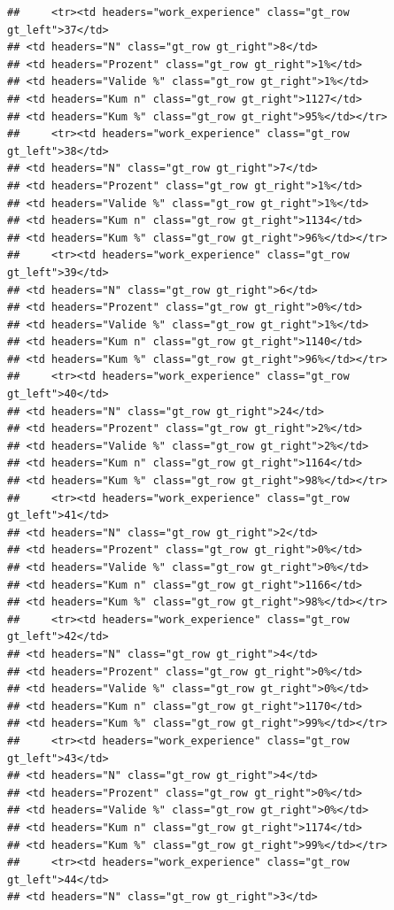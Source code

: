 \documentclass[
  a4paper,
  DIV=11,
  numbers=noendperiod]{scrartcl}
\begin{document}
\begin{verbatim}
##     <tr><td headers="work_experience" class="gt_row gt_left">37</td>
## <td headers="N" class="gt_row gt_right">8</td>
## <td headers="Prozent" class="gt_row gt_right">1%</td>
## <td headers="Valide %" class="gt_row gt_right">1%</td>
## <td headers="Kum n" class="gt_row gt_right">1127</td>
## <td headers="Kum %" class="gt_row gt_right">95%</td></tr>
##     <tr><td headers="work_experience" class="gt_row gt_left">38</td>
## <td headers="N" class="gt_row gt_right">7</td>
## <td headers="Prozent" class="gt_row gt_right">1%</td>
## <td headers="Valide %" class="gt_row gt_right">1%</td>
## <td headers="Kum n" class="gt_row gt_right">1134</td>
## <td headers="Kum %" class="gt_row gt_right">96%</td></tr>
##     <tr><td headers="work_experience" class="gt_row gt_left">39</td>
## <td headers="N" class="gt_row gt_right">6</td>
## <td headers="Prozent" class="gt_row gt_right">0%</td>
## <td headers="Valide %" class="gt_row gt_right">1%</td>
## <td headers="Kum n" class="gt_row gt_right">1140</td>
## <td headers="Kum %" class="gt_row gt_right">96%</td></tr>
##     <tr><td headers="work_experience" class="gt_row gt_left">40</td>
## <td headers="N" class="gt_row gt_right">24</td>
## <td headers="Prozent" class="gt_row gt_right">2%</td>
## <td headers="Valide %" class="gt_row gt_right">2%</td>
## <td headers="Kum n" class="gt_row gt_right">1164</td>
## <td headers="Kum %" class="gt_row gt_right">98%</td></tr>
##     <tr><td headers="work_experience" class="gt_row gt_left">41</td>
## <td headers="N" class="gt_row gt_right">2</td>
## <td headers="Prozent" class="gt_row gt_right">0%</td>
## <td headers="Valide %" class="gt_row gt_right">0%</td>
## <td headers="Kum n" class="gt_row gt_right">1166</td>
## <td headers="Kum %" class="gt_row gt_right">98%</td></tr>
##     <tr><td headers="work_experience" class="gt_row gt_left">42</td>
## <td headers="N" class="gt_row gt_right">4</td>
## <td headers="Prozent" class="gt_row gt_right">0%</td>
## <td headers="Valide %" class="gt_row gt_right">0%</td>
## <td headers="Kum n" class="gt_row gt_right">1170</td>
## <td headers="Kum %" class="gt_row gt_right">99%</td></tr>
##     <tr><td headers="work_experience" class="gt_row gt_left">43</td>
## <td headers="N" class="gt_row gt_right">4</td>
## <td headers="Prozent" class="gt_row gt_right">0%</td>
## <td headers="Valide %" class="gt_row gt_right">0%</td>
## <td headers="Kum n" class="gt_row gt_right">1174</td>
## <td headers="Kum %" class="gt_row gt_right">99%</td></tr>
##     <tr><td headers="work_experience" class="gt_row gt_left">44</td>
## <td headers="N" class="gt_row gt_right">3</td>

\end{verbatim}
\end{document}
